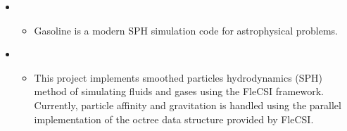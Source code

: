 \documentclass[letterpaper,10pt,english]{sphinxmanual}
\begin{document}
\begin{itemize}
\begin{itemize}
\end{itemize}

\item {} 
\begin{itemize}
\item {} 
Gasoline is a modern SPH simulation code for astrophysical
problems. 

\end{itemize}

\item {} 
\begin{itemize}
\item {} 
This project implements smoothed particles hydrodynamics (SPH)
method of simulating fluids and gases using the FleCSI framework.
Currently, particle affinity and gravitation is handled using the
parallel implementation of the octree data structure provided by
FleCSI.

\end{itemize}

\end{itemize}
\end{document}
